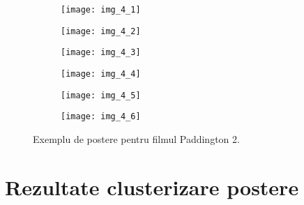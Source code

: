 \begin{figure}[!tbp]
  \begin{subfigure}[b]{0.3\textwidth}
    \texttt{[image: img\_4\_1]}
  \end{subfigure}
  \hfill
  \begin{subfigure}[b]{0.3\textwidth}
    \texttt{[image: img\_4\_2]}
  \end{subfigure}
  \hfill
  \begin{subfigure}[b]{0.3\textwidth}
    \texttt{[image: img\_4\_3]}
  \end{subfigure}
  \hfill
  \begin{subfigure}[b]{0.3\textwidth}
    \texttt{[image: img\_4\_4]}
  \end{subfigure}
  \hfill
  \begin{subfigure}[b]{0.3\textwidth}
    \texttt{[image: img\_4\_5]}
  \end{subfigure}
  \hfill
  \begin{subfigure}[b]{0.3\textwidth}
    \texttt{[image: img\_4\_6]}
  \end{subfigure}
  \caption[Exemple de postere]{Exemplu de postere pentru filmul Paddington 2.}
\end{figure}

\section{Rezultate clusterizare postere}


